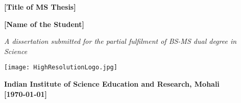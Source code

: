 \begin{titlepage}

    \begin{center}
        \sffamily
        \LARGE
        \textbf{[Title of MS Thesis]}
        \vspace{1cm}
        
        \Large
        \textbf{[Name of the Student]}
    
        \vspace{1cm}
        \large
        
        \textit{A dissertation submitted for the partial fulfilment of
        BS-MS dual degree in Science}
        
        \vspace{3.5cm}
    
        \texttt{[image: HighResolutionLogo.jpg]}
        \vspace{1cm}
        
        \large
        \textbf{Indian Institute of Science Education and Research, Mohali}\\
        \large
        \textbf{[\today]} 
    
    \end{center}
    
    
    \end{titlepage}
